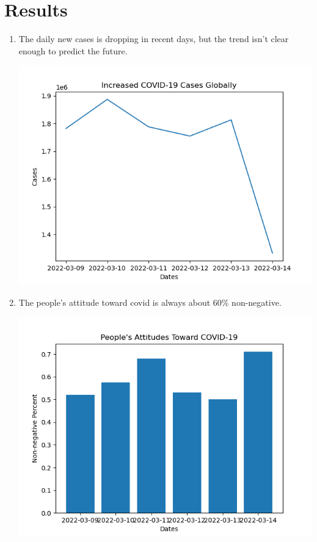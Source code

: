 \documentclass[a4paper, 12pt]{article}
\begin{document}
\section*{Results}
\begin{enumerate}
    \item The daily new cases is dropping in recent days, but the trend isn't clear enough to predict the future.
    \begin{center}
        \includegraphics[scale=0.6]{cases.png}
    \end{center}
    \item The people's attitude toward covid is always about 60\% non-negative.
    \begin{center}
        \includegraphics[scale=0.6]{attitudes.png}

\end{center}
\end{enumerate}
\end{document}
